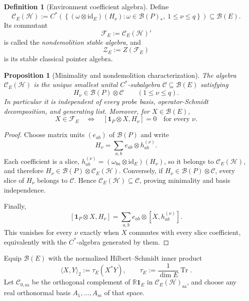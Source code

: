 \documentclass[11pt]{article}
\newtheorem{proposition}[theorem]{Proposition}
\theoremstyle{definition}
\newtheorem{definition}[theorem]{Definition}
\theoremstyle{remark}
\newcommand{\R}{\mathbb R}
\newcommand{\one}{\mathbf 1}
\newcommand{\id}{\mathrm{id}}
\newcommand{\Tr}{\operatorname{Tr}}
\begin{document}
\begin{definition}[Environment coefficient algebra]
\label{def:environment-coefficient-algebra}
Define
\[
 \mathcal C_E(\mathscr H)
 :=
 C^*\!\left(
 \left\{(\omega\otimes\id_E)(H_\nu):
 \omega\in\mathcal B(P)_*,\ 1\le\nu\le q\right\}
 \right)
 \subseteq\mathcal B(E).
\]
Its commutant
\[
 \mathcal F_E:=\mathcal C_E(\mathscr H)'
\]
is called the \emph{nondemolition stable algebra}, and
\[
 \mathcal Z_E:=Z(\mathcal F_E)
\]
is its stable classical pointer algebra.
\end{definition}

\begin{proposition}[Minimality and nondemolition characterization]
\label{prop:interaction-algebra-minimal}
The algebra \(\mathcal C_E(\mathscr H)\) is the unique smallest unital
\(C^*\)-subalgebra \(\mathcal C\subseteq\mathcal B(E)\) satisfying
\[
 H_\nu\in\mathcal B(P)\otimes\mathcal C
 \qquad(1\le\nu\le q).
\]
In particular it is independent of every probe basis, operator-Schmidt
decomposition, and generating list.  Moreover, for \(X\in\mathcal B(E)\),
\[
 \boxed{
 X\in\mathcal F_E
 \quad\Longleftrightarrow\quad
 [\one_P\otimes X,H_\nu]=0
 \quad\text{for every }\nu.}
\]
\end{proposition}

\begin{proof}
Choose matrix units \((e_{ab})\) of \(\mathcal B(P)\) and write
\[
 H_\nu=\sum_{a,b}e_{ab}\otimes h_{ab}^{(\nu)}.
\]
Each coefficient is a slice,
\(h_{ab}^{(\nu)}=(\omega_{ba}\otimes\id_E)(H_\nu)\), so it belongs to
\(\mathcal C_E(\mathscr H)\), and therefore
\(H_\nu\in\mathcal B(P)\otimes\mathcal C_E(\mathscr H)\).  Conversely, if
\(H_\nu\in\mathcal B(P)\otimes\mathcal C\), every slice of \(H_\nu\) belongs
to \(\mathcal C\).  Hence \(\mathcal C_E(\mathscr H)\subseteq\mathcal C\),
proving minimality and basis independence.

Finally,
\[
 [\one_P\otimes X,H_\nu]
 =\sum_{a,b}e_{ab}\otimes[X,h_{ab}^{(\nu)}].
\]
This vanishes for every \(\nu\) exactly when \(X\) commutes with every slice
coefficient, equivalently with the \(C^*\)-algebra generated by them.
\end{proof}

Equip \(\mathcal B(E)\) with the normalized Hilbert--Schmidt inner product
\[
 \langle X,Y\rangle_2:=\tau_E(X^*Y),
 \qquad \tau_E:=\frac1{\dim E}\Tr.
\]
Let \(\mathcal C_{0,\mathrm{sa}}\) be the orthogonal complement of
\(\R\one_E\) in \(\mathcal C_E(\mathscr H)_{\mathrm{sa}}\), and choose any
real orthonormal basis \(A_1,\ldots,A_m\) of that space.
\end{document}

